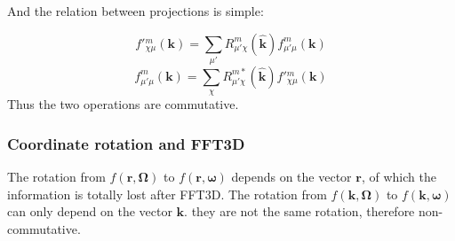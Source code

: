 And the relation between projections is simple:

\[
f'{}_{\chi\mu}^{m}(\mathbf{k})=\sum_{\mu'}R_{\mu'\chi}^{m}(\hat{\mathbf{k}})f_{\mu'\mu}^{m}(\mathbf{k})
\]
\[
f_{\mu'\mu}^{m}(\mathbf{k})=\sum_{\chi}R_{\mu'\chi}^{m*}(\hat{\mathbf{k}})f'{}_{\chi\mu}^{m}(\mathbf{k})
\]
Thus the two operations are commutative.


\subsubsection{Coordinate rotation and FFT3D}

The rotation from $f(\mathbf{r},\mathbf{\Omega})$ to $f(\mathbf{r},\boldsymbol{\omega})$
depends on the vector $\mathbf{r}$, of which the information is totally
lost after FFT3D. The rotation from $f(\mathbf{k},\mathbf{\Omega})$
to $f(\mathbf{k},\boldsymbol{\omega})$ can only depend on the vector
$\mathbf{k}$. they are not the same rotation, therefore non-commutative. 
